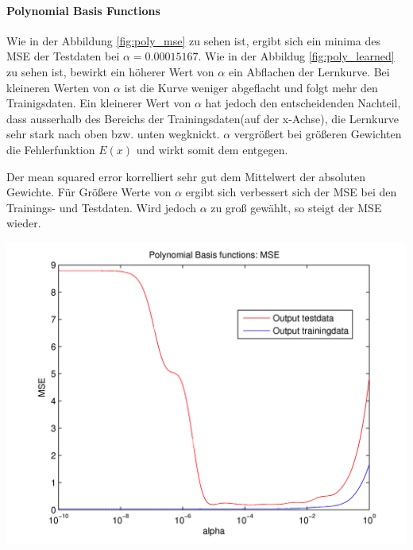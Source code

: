 


\paragraph{Polynomial Basis Functions}


Wie in der Abbildung \ref{fig:poly_mse} zu sehen ist, ergibt sich ein minima des MSE der Testdaten
bei $\alpha = 0.00015167$. Wie in der Abbildug \ref{fig:poly_learned} zu sehen ist, bewirkt ein höherer Wert von
$\alpha$ ein Abflachen der Lernkurve. Bei kleineren Werten von $\alpha$ ist die Kurve weniger abgeflacht und
folgt mehr den Trainigsdaten. Ein kleinerer Wert von $\alpha$ hat jedoch den entscheidenden Nachteil, dass ausserhalb
des Bereichs der Trainingsdaten(auf der x-Achse), die Lernkurve sehr stark nach oben bzw. unten wegknickt.
$\alpha$ vergrößert bei größeren Gewichten die Fehlerfunktion $E(x)$ und wirkt somit dem entgegen.

Der mean squared error korrelliert sehr gut dem Mittelwert der absoluten Gewichte. Für Größere Werte von $\alpha$
ergibt sich verbessert sich der MSE bei den Trainings- und Testdaten. Wird jedoch $\alpha$ zu groß gewählt, so steigt
der MSE wieder.


  \begin{center}
	\includegraphics[width=15cm]{figures/114/poly_mse.png}
	\label{fig:poly_mse}
  \end{center}

